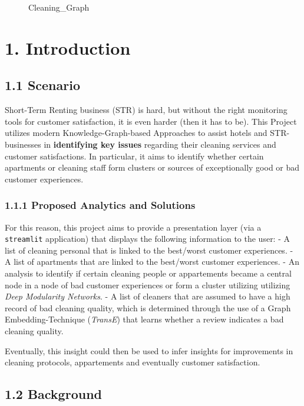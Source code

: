 \begin{figure}
\centering
\pandocbounded{}
\caption{Cleaning\_Graph}
\end{figure}

\section{1. Introduction}\label{introduction}

\subsection{1.1 Scenario}\label{scenario}

Short-Term Renting business (STR) is hard, but without the right
monitoring tools for customer satisfaction, it is even harder (then it
has to be). This Project utilizes modern Knowledge-Graph-based
Approaches to assist hotels and STR-businesses in \textbf{identifying
key issues} regarding their cleaning services and customer
satisfactions. In particular, it aims to identify whether certain
apartments or cleaning staff form clusters or sources of exceptionally
good or bad customer experiences.

\subsubsection{1.1.1 Proposed Analytics and
Solutions}\label{proposed-analytics-and-solutions}

For this reason, this project aims to provide a presentation layer (via
a \texttt{streamlit} application) that displays the following
information to the user: - A list of cleaning personal that is linked to
the best/worst customer experiences. - A list of apartments that are
linked to the best/worst customer experiences. - An analysis to identify
if certain cleaning people or appartements became a central node in a
node of bad customer experiences or form a cluster utilizing utilizing
\emph{Deep Modularity Networks}. - A list of cleaners that are assumed
to have a high record of bad cleaning quality, which is determined
through the use of a Graph Embedding-Technique (\emph{TransE}) that
learns whether a review indicates a bad cleaning quality.

Eventually, this insight could then be used to infer insights for
improvements in cleaning protocols, appartements and eventually customer
satisfaction.

\subsection{1.2 Background}\label{background}

